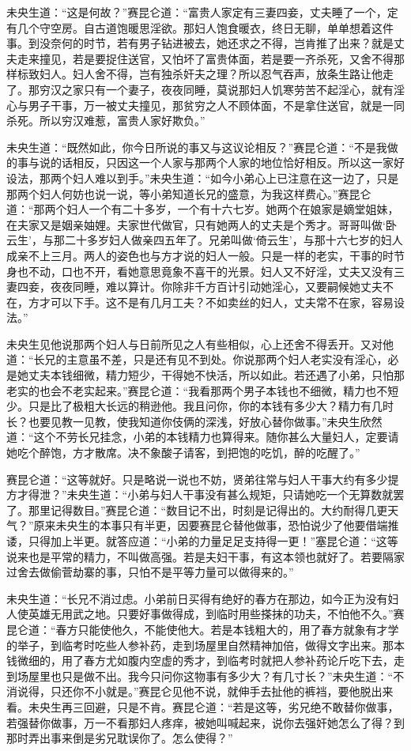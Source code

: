 \documentclass[a4paper,12pt,UTF8,twoside]{ctexbook}
\begin{document}
未央生道：“这是何故？”赛昆仑道：“富贵人家定有三妻四妾，丈夫睡了一个，定有几个守空房。自古道饱暖思淫欲。那妇人饱食暖衣，终日无聊，单单想着这件事。到没奈何的时节，若有男子钻进被去，她还求之不得，岂肯推了出来？就是丈夫走来撞见，若是要捉住送官，又怕坏了富贵体面，若是要一齐杀死，又舍不得那样标致妇人。妇人舍不得，岂有独杀奸夫之理？所以忍气吞声，放条生路让他走了。那穷汉之家只有一个妻子，夜夜同睡，莫说那妇人饥寒劳苦不起淫心，就有淫心与男子干事，万一被丈夫撞见，那贫穷之人不顾体面，不是拿住送官，就是一同杀死。所以穷汉难惹，富贵人家好欺负。”

未央生道：“既然如此，你今日所说的事又与这议论相反？”赛昆仑道：“不是我做的事与说的话相反，只因这一个人家与那两个人家的地位恰好相反。所以这一家好设法，那两个妇人难以到手。”未央生道：“如今小弟心上已注意在这一边了，只是那两个妇人何妨也说一说，等小弟知道长兄的盛意，为我这样费心。”赛昆仑道：“那两个妇人一个有二十多岁，一个有十六七岁。她两个在娘家是嫡堂姐妹，在夫家又是姻亲妯娌。夫家世代做官，只有她两人的丈夫是个秀才。哥哥叫做‘卧云生’，与那二十多岁妇人做亲四五年了。兄弟叫做‘倚云生’，与那十六七岁的妇人成亲不上三月。两人的姿色也与方才说的妇人一般。只是一样的老实，干事的时节身也不动，口也不开，看她意思竟象不喜干的光景。妇人又不好淫，丈夫又没有三妻四妾，夜夜同睡，难以算计。你除非千方百计引动她淫心，又要嗣候她丈夫不在，方才可以下手。这不是有几月工夫？不如卖丝的妇人，丈夫常不在家，容易设法。”

未央生见他说那两个妇人与日前所见之人有些相似，心上还舍不得丢开。又对他道：“长兄的主意虽不差，只是还有见不到处。你说那两个妇人老实没有淫心，必是她丈夫本钱细微，精力短少，干得她不快活，所以如此。若还遇了小弟，只怕那老实的也会不老实起来。”赛昆仑道：“我看那两个男子本钱也不细微，精力也不短少。只是比了极粗大长远的稍逊他。我且问你，你的本钱有多少大？精力有几时长？也要见教一见教，使我知道你伎俩的深浅，好放心替你做事。”未央生欣然道：“这个不劳长兄挂念，小弟的本钱精力也算得来。随你甚么大量妇人，定要请她吃个醉饱，方才散席。决不象酸子请客，到把饱的吃饥，醉的吃醒了。”

赛昆仑道：“这等就好。只是略说一说也不妨，贤弟往常与妇人干事大约有多少提方才得泄？”未央生道：“小弟与妇人干事没有甚么规矩，只请她吃一个无算数就罢了。那里记得数目。”赛昆仑道：“数目记不出，时刻是记得出的。大约耐得几更天气？”原来未央生的本事只有半更，因要赛昆仑替他做事，恐怕说少了他要借端推诿，只得加上半更。就答应道：“小弟的力量足足支持得一更！”塞昆仑道：“这等说来也是平常的精力，不叫做高强。若是夫妇干事，有这本领也就好了。若要隔家过舍去做偷菅劫寨的事，只怕不是平等力量可以做得来的。”

未央生道：“长兄不消过虑。小弟前日买得有绝好的春方在那边，如今正为没有妇人使英雄无用武之地。只要好事做得成，到临时用些搽抹的功夫，不怕他不久。”赛昆仑道：“春方只能使他久，不能使他大。若是本钱粗大的，用了春方就象有才学的举子，到临考时吃些人参补药，走到场屋里自然精神加倍，做得文字出来。那本钱微细的，用了春方尤如腹内空虚的秀才，到临考时就把人参补药论斤吃下去，走到场屋里也只是做不出。我今只问你这物事有多少大？有几寸长？”未央生道：“不消说得，只还你不小就是。”赛昆仑见他不说，就伸手去扯他的裤裆，要他脱出来看。未央生再三回避，只是不肯。赛昆仑道：“若是这等，劣兄绝不敢替你做事，若强替你做事，万一不看那妇人疼痒，被她叫喊起来，说你去强奸她怎么了得？到那时弄出事来倒是劣兄耽误你了。怎么使得？”
\end{document}
